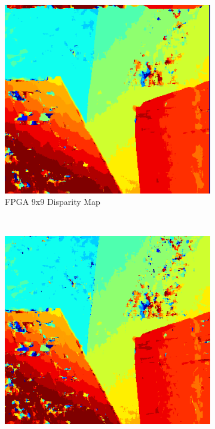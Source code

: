 \begin{figure}
\begin{center}
\begin{subfigure}{0.45\textwidth}
	\end{subfigure}
	\begin{subfigure}{0.45\textwidth}
		\includegraphics[width=\textwidth]{figures/venus_9x9_fpga.png}
		\caption{FPGA 9x9 Disparity Map}
		\label{fig:venusFPGA}
	\end{subfigure}
	\\
	\begin{subfigure}{0.45\textwidth}
		\includegraphics[width=\textwidth]{figures/venus_7x7_python3.png}

\end{subfigure}
\end{center}
\end{figure}
